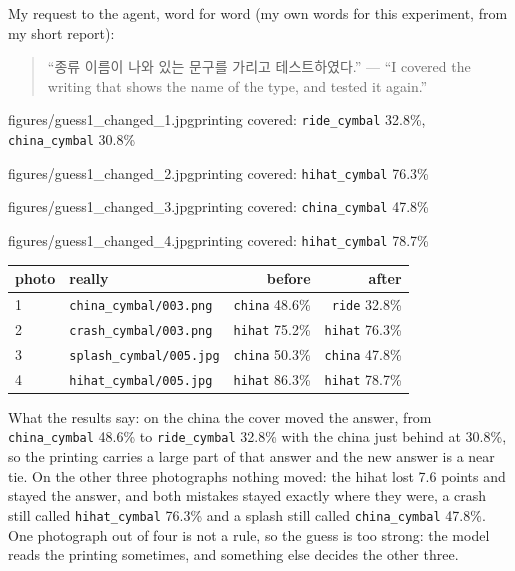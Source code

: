 \documentclass[11pt]{article}
\begin{document}
My request to the agent, word for word (my own words for this experiment, from
my short report):
\begin{quote}
“종류 이름이 나와 있는 문구를 가리고 테스트하였다.” --- ``I covered the
writing that shows the name of the type, and tested it again.''
\end{quote}

{figures/guess1_changed_1.jpg}{printing covered:
\texttt{ride\_cymbal} 32.8\%, \texttt{china\_cymbal} 30.8\%}

{figures/guess1_changed_2.jpg}{printing covered: \texttt{hihat\_cymbal} 76.3\%}

{figures/guess1_changed_3.jpg}{printing covered: \texttt{china\_cymbal} 47.8\%}

{figures/guess1_changed_4.jpg}{printing covered: \texttt{hihat\_cymbal} 78.7\%}

\begin{center}\footnotesize
\begin{tabular}{llrr}
\toprule
photo & really & before & after \\
\midrule
1 & \texttt{china\_cymbal/003.png}  & \texttt{china} 48.6\% & \texttt{ride} 32.8\% \\
2 & \texttt{crash\_cymbal/003.png}  & \texttt{hihat} 75.2\% & \texttt{hihat} 76.3\% \\
3 & \texttt{splash\_cymbal/005.jpg} & \texttt{china} 50.3\% & \texttt{china} 47.8\% \\
4 & \texttt{hihat\_cymbal/005.jpg}  & \texttt{hihat} 86.3\% & \texttt{hihat} 78.7\% \\
\bottomrule
\end{tabular}
\end{center}

What the results say: on the china the cover moved the answer, from
\texttt{china\_cymbal} 48.6\% to \texttt{ride\_cymbal} 32.8\% with the china just
behind at 30.8\%, so the printing carries a large part of that answer and the
new answer is a near tie. On the other three photographs nothing moved: the
hihat lost 7.6 points and stayed the answer, and both mistakes stayed exactly
where they were, a crash still called \texttt{hihat\_cymbal} 76.3\% and a splash
still called \texttt{china\_cymbal} 47.8\%. One photograph out of four is not a
rule, so the guess is too strong: the model reads the printing sometimes, and
something else decides the other three.
\end{document}
